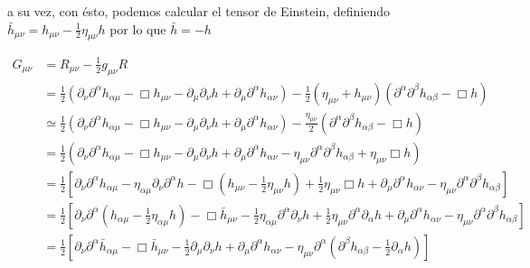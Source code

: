 \noindent
a su vez, con ésto, podemos calcular el tensor de Einstein, definiendo $\displaystyle \bar{h}_{\mu \nu} = h_{\mu \nu} - \frac{1}{2} \eta_{\mu \nu} h$ por lo que $\bar{h} = - h$

\begin{equation}
    \begin{split}
        G_{\mu \nu} &= R_{\mu \nu} - \frac{1}{2} g_{\mu \nu} R\\
        &= \frac{1}{2} \left( \partial_\nu \partial^\alpha h_{\alpha \mu} - \Box h_{\mu \nu} - \partial_\mu \partial_\nu h + \partial_\mu \partial^\alpha h_{\alpha \nu} \right) - \frac{1}{2} \left( \eta_{\mu \nu} + h_{\mu \nu} \right) \left( \partial^\alpha \partial^\beta h_{\alpha \beta} - \Box h \right)\\
        &\simeq \frac{1}{2} \left( \partial_\nu \partial^\alpha h_{\alpha \mu} - \Box h_{\mu \nu} - \partial_\mu \partial_\nu h + \partial_\mu \partial^\alpha h_{\alpha \nu} \right) - \frac{\eta_{\mu \nu}}{2} \left( \partial^\alpha \partial^\beta h_{\alpha \beta} - \Box h \right)\\
        &= \frac{1}{2} \left( \partial_\nu \partial^\alpha h_{\alpha \mu} - \Box h_{\mu \nu} -\partial_\mu \partial_\nu h + \partial_\mu \partial^\alpha h_{\alpha \nu} - \eta_{\mu \nu} \partial^\alpha \partial^\beta h_{\alpha \beta} + \eta_{\mu \nu} \Box h \right)\\
        &= \frac{1}{2} \left[ \partial_\nu \partial^\alpha h_{\alpha \mu} - \eta_{\alpha \mu} \partial_\nu \partial^\alpha h - \Box \left( h_{\mu \nu} - \frac{1}{2} \eta_{\mu \nu} h \right) + \frac{1}{2} \eta_{\mu \nu} \Box h + \partial_\mu \partial^\alpha h_{\alpha \nu} - \eta_{\mu \nu} \partial^\alpha \partial^\beta h_{\alpha \beta} \right]\\
        &= \frac{1}{2} \left[ \partial_\nu \partial^\alpha \left( h_{\alpha \mu} - \frac{1}{2} \eta_{\alpha \mu} h \right) - \Box \bar{h}_{\mu \nu} - \frac{1}{2} \eta_{\alpha \mu} \partial^\alpha \partial_\nu h + \frac{1}{2} \eta_{\mu \nu} \partial^\alpha \partial_\alpha h + \partial_\mu \partial^\alpha h_{\alpha \nu} - \eta_{\mu \nu} \partial^\alpha \partial^\beta h_{\alpha \beta} \right]\\
        &= \frac{1}{2} \left[ \partial_\nu \partial^\alpha \bar{h}_{\alpha \mu} - \Box \bar{h}_{\mu \nu} - \frac{1}{2} \partial_\mu \partial_\nu h + \partial_\mu \partial^\alpha h_{\alpha \nu} - \eta_{\mu \nu} \partial^\alpha \left( \partial^\beta h_{\alpha \beta} - \frac{1}{2} \partial_\alpha h \right) \right]\\

\end{split}
\end{equation}

